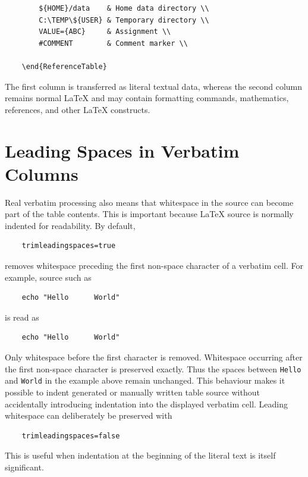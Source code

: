 \documentclass[
11pt,
a4paper,
oneside
]{scrbook}
\begin{document}
{\begin{verbatim}
		${HOME}/data    & Home data directory \\
		C:\TEMP\${USER} & Temporary directory \\
		VALUE={ABC}     & Assignment \\
		#COMMENT        & Comment marker \\
		
	\end{ReferenceTable}
\end{verbatim}

The first column is transferred as literal textual data, whereas the second
column remains normal \LaTeX{} and may contain formatting commands,
mathematics, references, and other \LaTeX{} constructs.

\section{Leading Spaces in Verbatim Columns}

Real verbatim processing also means that whitespace in the source can become
part of the table contents. This is important because \LaTeX{} source is
normally indented for readability.
By default,
\begin{verbatim}
	trimleadingspaces=true
\end{verbatim}
removes whitespace preceding the first non-space character of a verbatim
cell.
For example, source such as
\begin{verbatim}
	echo "Hello      World"
\end{verbatim}
is read as
\begin{verbatim}
	echo "Hello      World"
\end{verbatim}
Only whitespace before the first character is removed. Whitespace occurring
after the first non-space character is preserved exactly. Thus the spaces
between \texttt{Hello} and \texttt{World} in the example above remain
unchanged.
This behaviour makes it possible to indent generated or manually written
table source without accidentally introducing indentation into the displayed
verbatim cell.
Leading whitespace can deliberately be preserved with
\begin{verbatim}
	trimleadingspaces=false
\end{verbatim}
This is useful when indentation at the beginning of the literal text is
itself significant.

}
\end{document}
